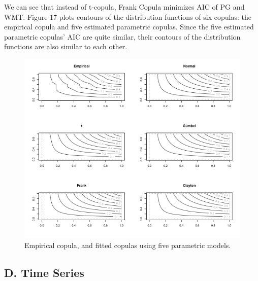 \documentclass[10pt]{article_simple}
\begin{document}
We can see that instead of t-copula, Frank Copula minimizes AIC of PG and WMT. Figure 17
plots contours of the distribution functions of six copulas: the empirical copula and five
estimated parametric copulas. Since the five estimated parametric copulas’ AIC are quite similar,
their contours of the distribution functions are also similar to each other.

\begin{figure}[H]
	\centering
  	\includegraphics[width=.95\linewidth]{Copula}
  	\centering
  	\caption{Empirical copula, and fitted copulas using five parametric models.}
\end{figure}


\subsection*{D. Time Series}
\end{document}
